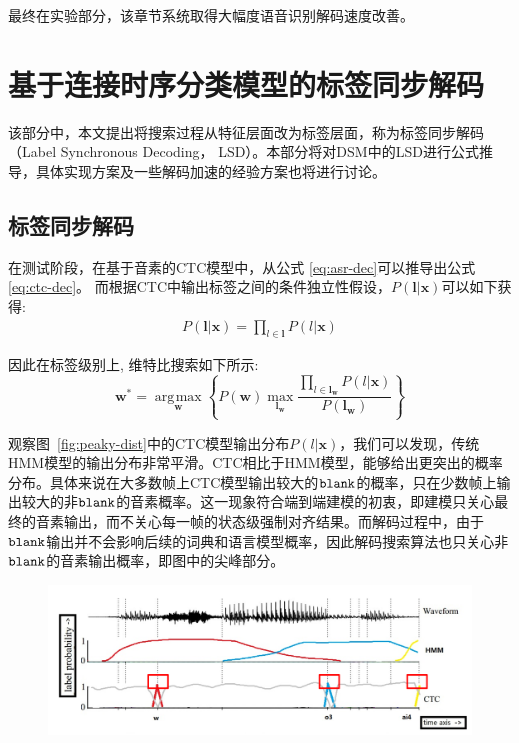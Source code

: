 最终在实验部分，该章节系统取得大幅度语音识别解码速度改善。

\section{基于连接时序分类模型的标签同步解码}
\label{chap:lsd-ctc}



该部分中，本文提出将搜索过程从特征层面改为标签层面，称为标签同步解码（Label Synchronous Decoding， LSD）。本部分将对DSM中的LSD进行公式推导，具体实现方案及一些解码加速的经验方案也将进行讨论。

\subsection{标签同步解码}
\label{chap:lsd-lsd-ctc-method}
在测试阶段，在基于音素的CTC模型中，从公式 \ref{eq:asr-dec}可以推导出公式\ref{eq:ctc-dec}。 而根据CTC中输出标签之间的条件独立性假设，$P(\mathbf{l}|\mathbf{x})$可以如下获得:
\begin{equation} \label{eq:indep-output-ctc}
  \begin{split}
        P(\mathbf{l}|\mathbf{x}) 
        = \prod_{l\in\mathbf{l}} P(l|\mathbf{x}) \end{split}
       \end{equation}

因此在标签级别上, 维特比搜索如下所示:
\begin{equation} \label{eq:ctc-dec-lsd}
   \mathbf{w}^* = \mathop{\arg\!\max}\limits_\mathbf{w} \left\{
        P(\mathbf{w})
        \mathop{\max}\limits_{\mathbf{l}_\mathbf{w}} \frac{ \prod_{l\in\mathbf{l}_\mathbf{w}} P(l|\mathbf{x}) }{P(\mathbf{l}_\mathbf{w})}\right\}
     \end{equation}

观察图~\ref{fig:peaky-dist}中的CTC模型输出分布$P(l|\mathbf{x})$，我们可以发现，传统HMM模型的输出分布非常平滑。CTC相比于HMM模型，能够给出更突出的概率分布。具体来说在大多数帧上CTC模型输出较大的$\tt blank$的概率，只在少数帧上输出较大的非$\tt blank$的音素概率。这一现象符合端到端建模的初衷，即建模只关心最终的音素输出，而不关心每一帧的状态级强制对齐结果。而解码过程中，由于$\tt blank$输出并不会影响后续的词典和语言模型概率，因此解码搜索算法也只关心非$\tt blank$的音素输出概率，即图中的尖峰部分。


\begin{figure}[!htp]
  \centering
    \captionstyle{\centering}
    \includegraphics[width=\textwidth]{figure/peaky_distribution.png}
\end{figure}

